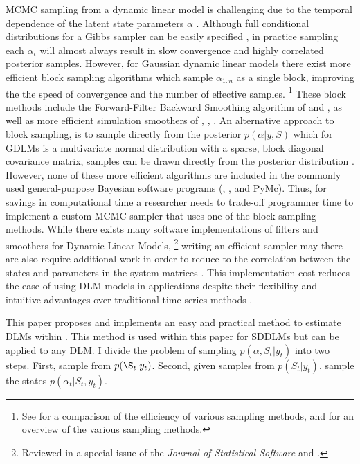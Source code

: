 \documentclass{article}
\begin{document}
MCMC sampling from a dynamic linear model is challenging due to the temporal dependence of the latent state parameters $\alpha$ \parencite{ReisSalazarGamerman2006}.
Although full conditional distributions for a Gibbs sampler can be easily specified \parencite{CarlinGelfandSmith1992}, in practice sampling each $\alpha_{t}$ will almost always result in slow convergence and highly correlated posterior samples.
However, for Gaussian dynamic linear models there exist more efficient block sampling algorithms which sample $\alpha_{1:n}$ as a single block, improving the the speed of convergence and the number of effective samples.%
\footnote{See \textcite{ReisSalazarGamerman2006} for a comparison of the efficiency of various sampling methods, and \textcite{migon2005dynamic} for an overview of the various sampling methods.}
These block methods include the Forward-Filter Backward Smoothing algorithm of \textcite{CarterKohn1994} and \textcite{Fruehwirth-Schnatter1994}, as well as more efficient simulation smoothers of \textcite{DeJongShephard1995}, \textcite{DurbinKoopman2002}, \textcite{StricklandTurnerDenhamEtAl2009}.%
An alternative approach to block sampling, is to sample directly from the posterior $p(\alpha | y, S)$ which for GDLMs is a multivariate normal distribution with a sparse, block diagonal covariance matrix, samples can be drawn directly from the posterior distribution \parencites{migon2005dynamic}{ChanJeliazkov2009}.
However, none of these more efficient algorithms are included in the commonly used general-purpose Bayesian software programs (, , and PyMc).
Thus, for savings in computational time a researcher needs to trade-off programmer time to implement a custom MCMC sampler that uses one of the block sampling methods.
While there exists many software implementations of filters and smoothers for Dynamic Linear Models,%
\footnote{Reviewed in a special issue of the \textit{Journal of Statistical Software} \textcite{CommandeurKoopmanOoms2011} and \textcite{Tusell2011}.}
writing an efficient sampler may there are also require additional work in order to reduce to the correlation between the states and parameters in the system matrices \parencites{ReisSalazarGamerman2006}{ChibNardariShephard2006}.
This implementation cost reduces the ease of using DLM models in applications despite their flexibility and intuitive advantages over traditional time series methods \textcite[51]{DurbinKoopman2001}.

This paper proposes and implements an easy and practical method to estimate DLMs within \Stan{} \parencite{Stan2013}.
This method is used within this paper for SDDLMs but can be applied to any DLM.
I divide the problem of sampling $p(\alpha, S_{t} | y_{t})$ into two steps.
First, sample from $p(\S_{t} | y_{t})$. 
Second, given samples from $p(S_{t} | y_{t})$, sample the states $p(\alpha_{t} | S_{t}, y_{t})$.
\end{document}
